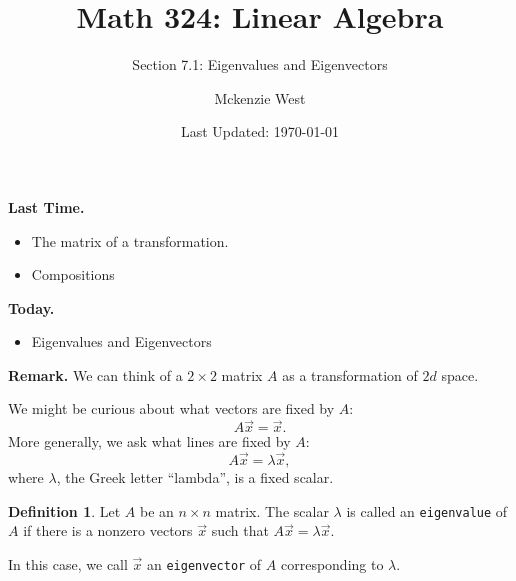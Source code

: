 \documentclass{beamer}
\newcommand{\fn}{\insertframenumber}
\theoremstyle{definition}
\newtheorem*{defn}{Definition}
\renewcommand{\emph}[1]{{\color{blue}\texttt{#1}}}
\begin{document}
	\title{Math 324: Linear Algebra}
	\subtitle{Section 7.1: Eigenvalues and Eigenvectors}
	\author{Mckenzie West}
	\date{Last Updated: \today}
\begin{frame}[fragile]
\maketitle	
\end{frame}

\begin{frame}{\insertframenumber}
	\begin{block}{\textbf{Last Time.}}
	\begin{itemize}[label=--]
		\item The matrix of a transformation.
		\item Compositions
	\end{itemize}
	\end{block}
	\begin{block}{\textbf{Today.}}
		\begin{itemize}[label=--]
			\item Eigenvalues and Eigenvectors
		\end{itemize}
	\end{block}
\end{frame}
\begin{frame}{\fn}
	\begin{block}{\textbf{Remark.}}
		We can think of a $2\times 2$ matrix $A$ as a transformation of $2d$ space.
		
		We might be curious about what vectors are fixed by $A$:
			\[A\vec x=\vec x.\]
		More generally, we ask what lines are fixed by $A$:
			\[A\vec x=\lambda\vec x,\]
		where $\lambda$, the Greek letter ``lambda'', is a fixed scalar.
	\end{block}
	\begin{defn}
		Let $A$ be an $n\times n$ matrix.  The scalar $\lambda$ is called an \emph{eigenvalue} of $A$ if there is a nonzero vectors $\vec x$ such that $A\vec x=\lambda \vec x$.  
		
		In this case, we call $\vec x$ an \emph{eigenvector} of $A$ corresponding to $\lambda$.
	\end{defn}
\end{frame}
\end{document}
